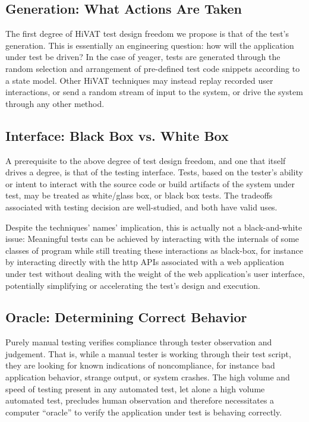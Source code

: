\subsection{Generation: What Actions Are Taken}
The first degree of HiVAT test design freedom we propose is that of the test's generation. This is essentially an engineering question: how will the application under test be driven? In the case of yeager, tests are generated through the random selection and arrangement of pre-defined test code snippets according to a state model. Other HiVAT techniques may instead replay recorded user interactions, or send a random stream of input to the system, or drive the system through any other method.

\subsection{Interface: Black Box vs. White Box}
A prerequisite to the above degree of test design freedom, and one that itself drives a degree, is that of the testing interface. Tests, based on the tester's ability or intent to interact with the source code or build artifacts of the system under test, may be treated as white/glass box, or black box tests. The tradeoffs associated with testing decision are well-studied, and both have valid uses.

Despite the techniques' names' implication, this is actually not a black-and-white issue: Meaningful tests can be achieved by interacting with the internals of some classes of program while still treating these interactions as black-box, for instance by interacting directly with the http APIs associated with a web application under test without dealing with the weight of the web application's user interface, potentially simplifying or accelerating the test's design and execution.\citep{HoffmanTradeoffs}

\subsection{Oracle: Determining Correct Behavior}
Purely manual testing verifies compliance through tester observation and judgement. That is, while a manual tester is working through their test script, they are looking for known indications of noncompliance, for instance bad application behavior, strange output, or system crashes. The high volume and speed of testing present in any automated test, let alone a high volume automated test, precludes human observation and therefore necessitates a computer ``oracle'' to verify the application under test is behaving correctly.

